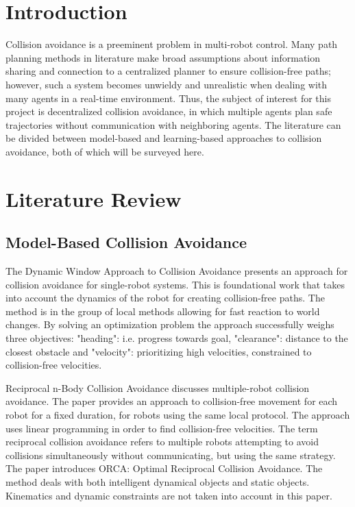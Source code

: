 \documentclass[conference]{IEEEtran}
\begin{document}
\section{Introduction}
Collision avoidance is a preeminent problem in multi-robot control. Many path planning methods in literature make broad assumptions about information sharing and connection to a centralized planner to ensure collision-free paths; however, such a system becomes unwieldy and unrealistic when dealing with many agents in a real-time environment. Thus, the subject of interest for this project is decentralized collision avoidance, in which multiple agents plan safe trajectories without communication with neighboring agents. The literature can be divided between model-based and learning-based approaches to collision avoidance, both of which will be surveyed here.
\section{Literature Review}

\subsection{Model-Based Collision Avoidance}
The Dynamic Window Approach to Collision Avoidance \cite{fox1997dynamic} presents an approach for collision avoidance for single-robot systems. This is foundational work that takes into account the dynamics of the robot for creating collision-free paths. The method is in the group of local methods allowing for fast reaction to world changes. By solving an optimization problem the approach successfully weighs three objectives: "heading": i.e. progress towards goal, "clearance": distance to the closest obstacle and "velocity": prioritizing high velocities, constrained to collision-free velocities. 

Reciprocal n-Body Collision Avoidance \cite{berg2011reciprocal} discusses multiple-robot collision avoidance. The paper provides an approach to collision-free movement for each robot for a fixed duration, for robots using the same local protocol. The approach uses linear programming in order to find collision-free velocities. The term reciprocal collision avoidance refers to multiple robots attempting to avoid collisions simultaneously without communicating, but using the same strategy. 
The paper introduces ORCA: Optimal Reciprocal Collision Avoidance. The method deals with both intelligent dynamical objects and static objects. Kinematics and dynamic constraints are not taken into account in this paper.
\end{document}
